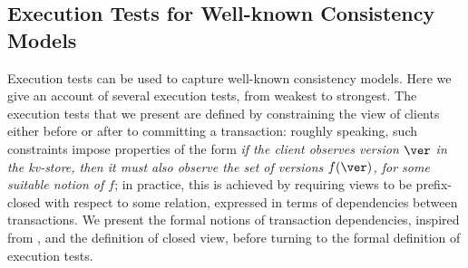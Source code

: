 % 
%


\subsection{Execution Tests for Well-known Consistency Models}\label{subsec:cm_examples}

Execution tests can be used to capture well-known consistency models. 
Here we give an account of several execution tests, from weakest 
to strongest.
The execution tests that we present are defined by 
constraining the view of clients either before or after to committing a transaction: roughly 
speaking, such constraints impose properties of the form \emph{if the client 
observes version $\ver$ in the kv-store, then it must also observe 
the set of versions $f(\ver)$, for some suitable notion of $f$}; 
in practice, this is achieved by requiring views to be prefix-closed with respect 
to some relation, expressed in terms of dependencies between transactions.
We present the formal notions of transaction dependencies, inspired from 
\cite{adya}, and the definition of closed view, before turning to the formal definition 
of execution tests. 

